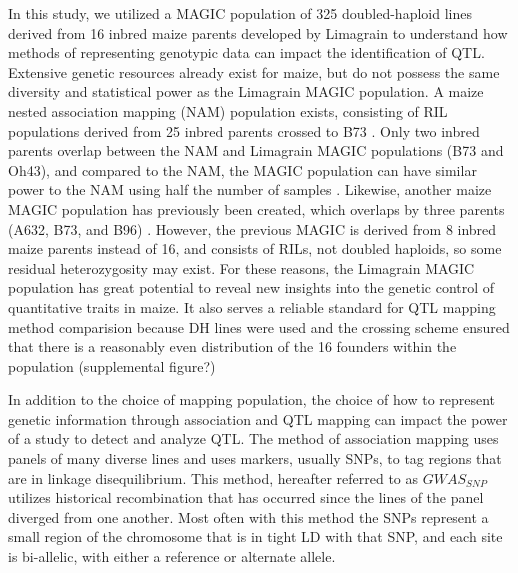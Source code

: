 \documentclass[article,9pt,twocolumn,twoside]{rilabRxiv}
\begin{document}
In this study, we utilized a MAGIC population of 325 doubled-haploid lines derived from 16 inbred maize parents developed by Limagrain to understand how methods of representing genotypic data can impact the identification of QTL.
Extensive genetic resources already exist for maize, but do not possess the same diversity and statistical power as the Limagrain MAGIC population.
A maize nested association mapping (NAM) population exists, consisting of RIL populations derived from 25 inbred parents crossed to B73 \citep{RN11}.
Only two inbred parents overlap between the NAM and Limagrain MAGIC populations (B73 and Oh43), and compared to the NAM, the MAGIC population can have similar power to the NAM using half the number of samples \citep{RN4}.
Likewise, another maize MAGIC population has previously been created, which overlaps by three parents (A632, B73, and B96) \citep{RN4}.
However, the previous MAGIC is derived from 8 inbred maize parents instead of 16, and consists of RILs, not doubled haploids, so some residual heterozygosity may exist.
For these reasons, the Limagrain MAGIC population has great potential to reveal new insights into the genetic control of quantitative traits in maize.
It also serves a reliable standard for QTL mapping method comparision because DH lines were used and the crossing scheme ensured that there is a reasonably even distribution of the 16 founders within the population (supplemental figure?)

In addition to the choice of mapping population, the choice of how to represent genetic information through association and QTL mapping can impact the power of a study to detect and analyze QTL.
The method of association mapping uses panels of many diverse lines and uses markers, usually SNPs, to tag regions that are in linkage disequilibrium.
This method, hereafter referred to as $GWAS_{SNP}$ utilizes historical recombination that has occurred since the lines of the panel diverged from one another. Most often with this method the SNPs represent a small region of the chromosome that is in tight LD with that SNP, and each site is bi-allelic, with either a reference or alternate allele.
\end{document}
